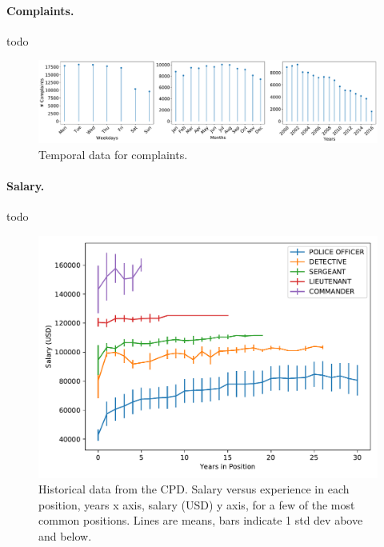 \paragraph{Complaints.} todo

\begin{figure}[h] 
	\includegraphics[width=\textwidth]{figs/complaints_times} 
	\caption{Temporal data for complaints.} \label{fig:complaints}
\end{figure}


\paragraph{Salary.} todo

\begin{figure}[h] 
\includegraphics[width=\textwidth]{figs/salary} 
\caption{Historical data from the CPD. Salary versus experience in each
position, years x axis, salary (USD) y axis, for a few of the most common
positions. Lines are means, bars indicate 1 std dev above and below.} \label{fig:salary}
\end{figure}

